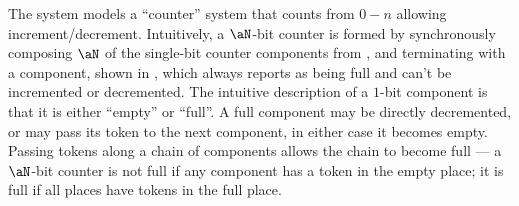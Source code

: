 The \counterSys{\aN} system models a ``counter'' system that counts from $0-n$
allowing increment/decrement. Intuitively, a $\aN$-bit counter is
formed by synchronously composing $\aN$ of the single-bit counter components
from , and terminating with a \zerobitC{} component, shown
in , which always reports as being full and can't be
incremented or decremented. The intuitive description of a $1$-bit component is
that it is either ``empty'' or ``full''. A full component may be directly
decremented, or may pass its token to the next component, in either case it
becomes empty. Passing tokens along a chain of components allows the chain to
become full --- a $\aN$-bit counter is not full if any component has a token in
the empty place; it is full if all places have tokens in the full place.

